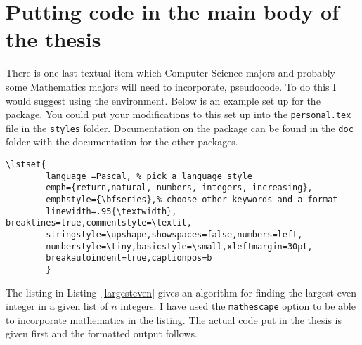 \section{Putting code in the main body of the thesis}
There is one last textual item which Computer Science majors and probably some Mathematics majors will need to incorporate, pseudocode. To do this I would suggest using the  environment. Below is an example set up for the  package. You could put your modifications to this set up into the \texttt{personal.tex} file in the \texttt{styles} folder. Documentation on the  package can be found in the \texttt{doc} folder with the documentation for the other packages.
{\small\begin{singlespace}
\begin{verbatim}
\lstset{
        language =Pascal, % pick a language style
        emph={return,natural, numbers, integers, increasing},
        emphstyle={\bfseries},% choose other keywords and a format
        linewidth=.95{\textwidth}, breaklines=true,commentstyle=\textit,
        stringstyle=\upshape,showspaces=false,numbers=left,
        numberstyle=\tiny,basicstyle=\small,xleftmargin=30pt,
        breakautoindent=true,captionpos=b
        }
\end{verbatim}
\end{singlespace}}

The listing in Listing~\ref{largesteven} gives an algorithm for finding the largest even integer in a given list of $n$ integers. I have used the \texttt{mathescape} option to be able to incorporate mathematics in the listing. The actual code put in the thesis is given first and the formatted output follows.

